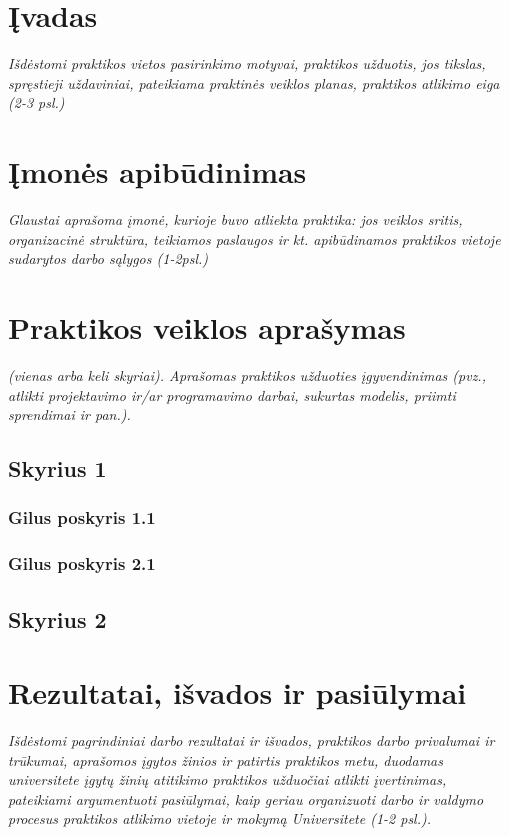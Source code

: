 \section{Įvadas}

\par \emph{Išdėstomi praktikos vietos pasirinkimo motyvai, praktikos
  užduotis, jos tikslas, spręstieji uždaviniai, pateikiama praktinės
  veiklos planas, praktikos atlikimo eiga (2-3 psl.)}


\section{Įmonės apibūdinimas}

\par \emph{Glaustai aprašoma įmonė, kurioje buvo atliekta praktika:
  jos veiklos sritis, organizacinė struktūra, teikiamos paslaugos ir
  kt. apibūdinamos praktikos vietoje sudarytos darbo sąlygos
  (1-2psl.)}


\section{Praktikos veiklos aprašymas}

\par \emph{(vienas arba keli skyriai). Aprašomas praktikos užduoties
  įgyvendinimas (pvz., atlikti projektavimo ir/ar programavimo darbai,
  sukurtas modelis, priimti sprendimai ir pan.).}

\subsection{Skyrius 1}

\subsubsection{Gilus poskyris 1.1}

\subsubsection{Gilus poskyris 2.1}

\subsection{Skyrius 2}


\section{Rezultatai, išvados ir pasiūlymai}

\par \emph{Išdėstomi pagrindiniai darbo rezultatai ir išvados,
  praktikos darbo privalumai ir trūkumai, aprašomos įgytos žinios ir
  patirtis praktikos metu, duodamas universitete įgytų žinių atitikimo
  praktikos užduočiai atlikti įvertinimas, pateikiami argumentuoti
  pasiūlymai, kaip geriau organizuoti darbo ir valdymo procesus
  praktikos atlikimo vietoje ir mokymą Universitete (1-2 psl.).}

